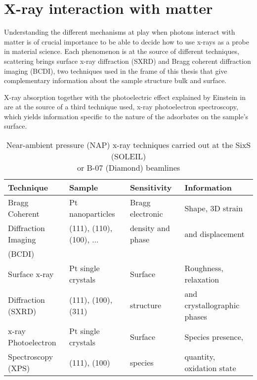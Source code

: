 \section{X-ray interaction with matter} \label{sec:XRIntMatter}

Understanding the different mechanisms at play when photons interact with matter is of crucial importance to be able to decide how to use x-rays as a probe in material science.
Each phenomenon is at the source of different techniques, scattering brings surface x-ray diffraction (SXRD) and Bragg coherent diffraction imaging (BCDI), two techniques used in the frame of this thesis that give complementary information about the sample structure bulk and surface.

X-ray absorption together with the photoelectric effect explained by Einstein in \cite*{Einstein1905} are at the source of a third technique used, x-ray photoelectron spectroscopy, which yields information specific to the nature of the adsorbates on the sample's surface.

\begin{table}[!htb]
    \centering
    \small
    \begin{tabular}{l|l|l|l}
        Technique & Sample & Sensitivity & Information \\
        \toprule
        Bragg Coherent & Pt nanoparticles & Bragg electronic & Shape, 3D strain  \\
        Diffraction Imaging & (111), (110), (100), ... & density and phase & and displacement \\
        (BCDI) &  &  & \\
        \midrule
        Surface x-ray & Pt single crystals & Surface & Roughness, relaxation \\
        Diffraction (SXRD) & (111), (100), (311) & structure & and crystallographic phases \\
        \midrule
        x-ray Photoelectron & Pt single crystals & Surface & Species presence, \\
        Spectroscopy (XPS) & (111), (100) & species & quantity, oxidation state \\
        \bottomrule
    \end{tabular}
    \caption{Near-ambient pressure (NAP) x-ray techniques carried out at the SixS (SOLEIL) \\ or B-07 (Diamond) beamlines}
    \label{tab:techniques}
\end{table}

